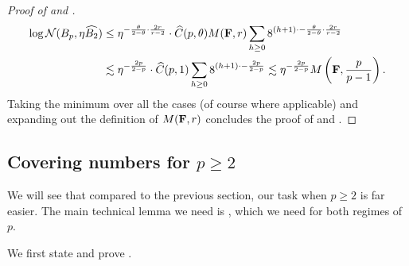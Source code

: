 \documentclass[11pt]{article}
\numberwithin{equation}{section}
\begin{document}
\begin{proof}[Proof of  and ]
\begin{align*}
    \log\mathcal{N}(B_p,\eta \widehat{B_2}) &\le \eta^{-\frac{\theta}{2-\theta}\cdot\frac{2r}{r-2}} \cdot \widehat{C}(p,\theta) M(\mathbf{F},r)\sum_{h \ge 0} 8^{(h+1) \cdot -\frac{\theta}{2-\theta}\cdot\frac{2r}{r-2}} \\
    &\lesssim \eta^{-\frac{2p}{2-p}} \cdot \widehat{C}(p,1)\sum_{h \ge 0} 8^{(h+1) \cdot -\frac{2p}{2-p}} \lesssim \eta^{-\frac{2p}{2-p}}M\left(\mathbf{F},\frac{p}{p-1}\right).
\end{align*}
Taking the minimum over all the cases (of course where applicable) and expanding out the definition of $M(\mathbf{F},r)$ concludes the proof of  and .
\end{proof}

\subsection{Covering numbers for \texorpdfstring{$p \ge 2$}{p > 2}}

We will see that compared to the previous section, our task when $p\ge 2$ is far easier. The main technical lemma we need is , which we need for both regimes of $p$.

We first state and prove .
\end{document}
